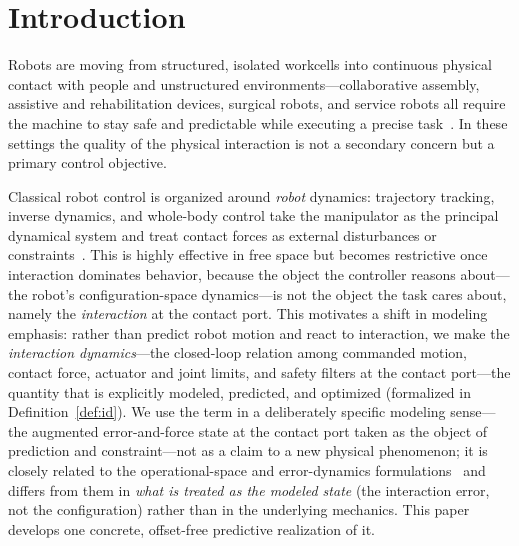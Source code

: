 \documentclass[journal]{IEEEtran}
\begin{document}
\section{Introduction}

Robots are moving from structured, isolated workcells into continuous
physical contact with people and unstructured environments---collaborative
assembly, assistive and rehabilitation devices, surgical robots, and service
robots all require the machine to stay safe and predictable while executing a
precise task~\cite{villani2016force,albu2007unified,haddadin2009requirements}.
In these settings the quality of the physical interaction is not a secondary
concern but a primary control objective.

Classical robot control is organized around \emph{robot} dynamics: trajectory
tracking, inverse dynamics, and whole-body control take the manipulator as the
principal dynamical system and treat contact forces as external disturbances
or constraints~\cite{khatib1987unified}. This is highly effective in free
space but becomes restrictive once interaction dominates behavior, because the
object the controller reasons about---the robot's configuration-space
dynamics---is not the object the task cares about, namely the \emph{interaction}
at the contact port. This motivates a shift in modeling emphasis: rather than
predict robot motion and react to interaction, we make the \emph{interaction
dynamics}---the closed-loop relation among commanded motion, contact
force, actuator and joint limits, and safety filters at the contact port---the quantity that is
explicitly modeled, predicted, and optimized (formalized in Definition~\ref{def:id}). We use
the term in a deliberately specific modeling sense---the augmented
error-and-force state at the contact port taken as the object of prediction
and constraint---not as a claim to a new physical phenomenon; it is closely
related to the operational-space and error-dynamics
formulations~\cite{khatib1987unified,siciliano2009robotics} and differs from
them in \emph{what is treated as the modeled state} (the interaction error, not
the configuration) rather than in the underlying mechanics. This paper develops
one concrete, offset-free predictive realization of it.
\end{document}
